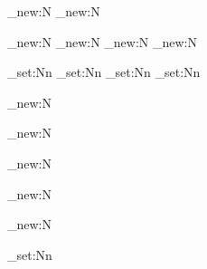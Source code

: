 \int_new:N\@tauthesis@fithesistypeint
\int_new:N\@tauthesis@enthesistypeint

\int_new:N\@tauthesis@bachelorsthesistypeint
\int_new:N\@tauthesis@mastersthesistypeint
\int_new:N\@tauthesis@licentiatethesistypeint
\int_new:N\@tauthesis@doctoralthesistypeint

\int_set:Nn
\int_set:Nn
\int_set:Nn
\int_set:Nn

\tl_new:N\@tauthesis@mainlanguage

\bool_new:N\@tauthesis@includePublications

\bool_new:N\@tauthesis@includeListOfFigures

\bool_new:N\@tauthesis@includeListOfTables

\bool_new:N\@tauthesis@includeListOfListings

\tl_set:Nn\@tauthesis@bindingoffsetwidth {0.5cm}


